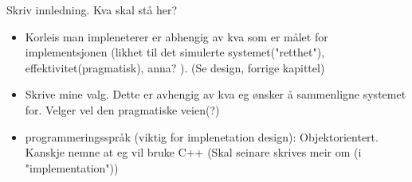 %
%
%






Skriv innledning. Kva skal stå her?
\begin{itemize}
	\item Korleis man impleneterer er abhengig av kva som er målet for implementsjonen (likhet til det simulerte systemet("retthet"), effektivitet(pragmatisk), anna? ). (Se design, forrige kapittel)%
	\item Skrive mine valg. Dette er avhengig av kva eg ønsker å sammenligne systemet for. Velger vel den pragmatiske veien(?)
	\item programmeringsspråk (viktig for implenetation design): Objektorientert. Kanskje nemne at eg vil bruke C++ (Skal seinare skrives meir om (i "implementation"))
\end{itemize}




